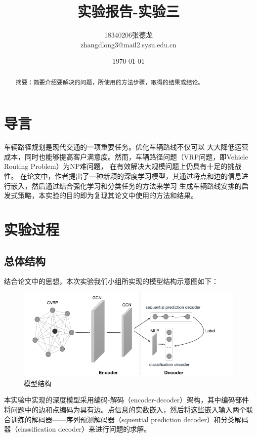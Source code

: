 \documentclass[withoutpreface,bwprint]{cumcmthesis} %
\title{实验报告-实验三}
\author{18340206张德龙 \\
	zhangdlong3@mail2.sysu.edu.cn
}
\date{\today}
\begin{document}
\maketitle
\begin{abstract}
 
 摘要：简要介绍要解决的问题，所使用的方法步骤，取得的结果或结论。
\end{abstract}

\section{导言}

	
	
	车辆路径规划是现代交通的一项重要任务。优化车辆路线不仅可以
	大大降低运营成本，同时也能够提高客户满意度。然而，车辆路径问题（VRP问题，即Vehicle Routing Problem）为NP难问题，
	在有效解决大规模问题上仍具有十足的挑战性。
	在论文\cite{1}中，作者提出了一种新颖的深度学习模型，其通过将点和边的信息进行嵌入，然后通过结合强化学习和分类任务的方法来学习
	生成车辆路线安排的启发式策略，本实验的目的即为复现其论文中使用的方法和结果。

\section{实验过程}

\subsection{总体结构}
	结合论文\cite{1}中的思想，本次实验我们小组所实现的模型结构示意图如下：
	\begin{figure}[H]
		\centering
		\includegraphics[width=1\linewidth]{struct}
		\caption{模型结构}
	\end{figure}
	本实验中实现的深度模型采用编码-解码（encoder-decoder）架构，其中编码部件将问题中的边和点编码为具有边。点信息的实数嵌入，然后将这些嵌入输入两个联合训练的解码器——序列预测解码器（squential prediction decoder）和分类解码器（classification  decoder）来进行问题的求解。
\end{document}
